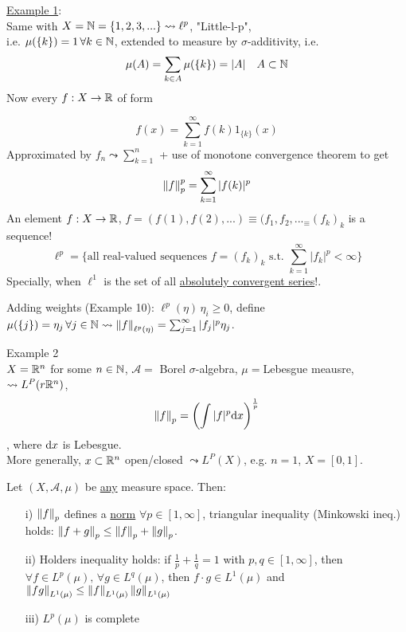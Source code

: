 \documentclass{article}
\begin{document}
\underline{Example 1}:\\
Same with $X=\mathbb{N}=\{1,2,3,...\}\mathrel{\leadsto} \ell^p$, "Little-l-p",\\
i.e. $\mu(\{k\})=1\,\forall k\in\mathbb{N}$, extended to measure by $\sigma$-additivity, i.e.
$$
	\mu(A)=\sum_{k\in A} \mu(\{k\})=|A|\quad A\subset \mathbb{N}
$$
Now every $f:X\to \mathbb{R} $ of form

$$f(x)=\sum_{k=1}^\infty f(k)1_{\{k\}}(x)$$
Approximated by $f_n\mathrel{\leadsto}\sum_{k=1}^n$ + use of monotone convergence theorem to get
$$\left\|{f}\right\|_p^p=\sum_{k=1}^\infty |f(k)|^p$$
An element $f:X\to \mathbb{R}$, $f=(f(1),f(2),...)\equiv(f_1,f_2,..._\equiv(f_k)_k$ is a sequence!
$$\ell^p=
	\{
	\text{all real-valued sequences }
	f=(f_k)_k
	\text{ s.t. }
	\sum_{k=1}^\infty|f_k|^p<\infty
	\}$$
Specially, when $\ell^1$ is the set of all \underline{absolutely convergent series}!.
\begin{remark}
	Adding weights (Example 10): $\ell^p(\eta)\,\eta_i\geq0$, define $\mu(\{j\})=\eta_j\,\forall j\in\mathbb{N}\mathrel{\leadsto}\left\|{f}\right\|_{\ell^p(\eta)}=\sum_{j=1}^\infty|f_j|^p\eta_j$.
\end{remark}

Example 2\\
$X=\mathbb{R}^n$ for some $n\in\mathbb{N}$, $\mathcal{A}=$ Borel $\sigma$-algebra, $\mu=$Lebesgue meausre, $\mathrel{\leadsto}L^P(r\mathbb{R}^n)$,
$$\left\|{f}\right\|_p=\left(\int|f|^p{\rm d}x\right)^\frac{1}{p}$$,
where ${\rm{d}}x$ is Lebesgue. \\
More generally, $x\subset \mathbb{R}^n$ open/closed $\mathrel{\leadsto} L^P(X)$, e.g. $n=1$, $X=[0,1]$.



\begin{theorem}
	Let $(X,\mathcal{A},\mu)$ be {\underline {any}} measure space. Then:
	\begin{itemize}
		\item [i)] $\left\|{f}\right\|_p$ defines a \underline{norm} $\forall p\in[1,\infty]$, triangular inequality (Minkowski ineq.) holds: $\left\|{f+g}\right\|_p\leq\left\|{f}\right\|_p+\left\|{g}\right\|_p$.
		\item [ii)] Holders inequality holds: if $\frac{1}{p}+\frac{1}{q}=1$ with $p,q\in[1,\infty]$, then $\forall f\in L^p(\mu),\,\forall g\in L^q(\mu)$, then $f\cdot g\in L^1(\mu)$ and $\left\|{fg}\right\|_{L^1(\mu)}\leq\left\|{f}\right\|_{L^1(\mu)}\left\|{g}\right\|_{L^1(\mu)}$
		\item [iii)] $L^p(\mu)$ is complete
	\end{itemize}
\end{theorem}
\end{document}
